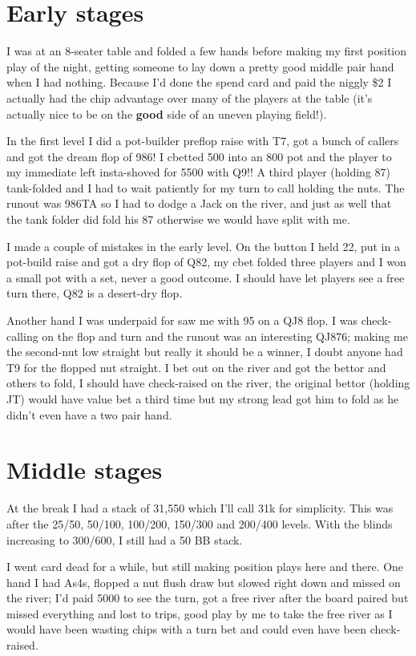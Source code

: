\section{Early stages}

I was at an 8-seater table and folded a few hands before
making my first position play of the night, getting someone
to lay down a pretty good middle pair hand when I had nothing.
Because I'd done the spend card and paid the niggly \$2 I actually
had the chip advantage over many of the players at the table
(it's actually nice to be on the \textbf{good} side of an
uneven playing field!).

In the first level I did a pot-builder preflop raise with T7,
got a bunch of callers and got the dream flop of 986! I cbetted
500 into an 800 pot and the player to my immediate left
insta-shoved for 5500 with Q9!! A third player (holding 87) tank-folded
and I had to wait patiently for my turn to call holding the nuts.
The runout was 986TA so I had to dodge a Jack on the river,
and just as well that the tank folder did fold his 87 otherwise we
would have split with me.

I made a couple of mistakes in the early level. On the button I held
22, put in a pot-build raise and got a dry flop of Q82, my cbet
folded three players and I won a small pot with a set, never a
good outcome. I should have let players see a free turn there, Q82
is a desert-dry flop.

Another hand I was underpaid for saw me with 95 on a QJ8 flop. I was
check-calling on the flop and turn and the runout was an interesting
QJ876; making me the second-nut low straight but really it
should be a winner, I doubt anyone had T9 for the flopped nut straight.
I bet out on the river and got the bettor and others to fold, I should
have check-raised on the river, the original bettor (holding JT)
would have value bet a third time but my strong lead got him to fold
as he didn't even have a two pair hand.

\section{Middle stages}

At the break I had a stack of 31,550 which I'll call 31k for simplicity.
This was after the 25/50, 50/100, 100/200, 150/300 and 200/400 levels.
With the blinds increasing to 300/600, I still had a 50 BB stack.

I went card dead for a while, but still making position plays here
and there. One hand I had As4s, flopped a nut flush draw but slowed
right down and missed on the river; I'd paid 5000 to see the turn,
got a free river after the board paired but missed everything and
lost to trips, good play by me to take the free river as I would
have been wasting chips with a turn bet and could even have been
check-raised.


